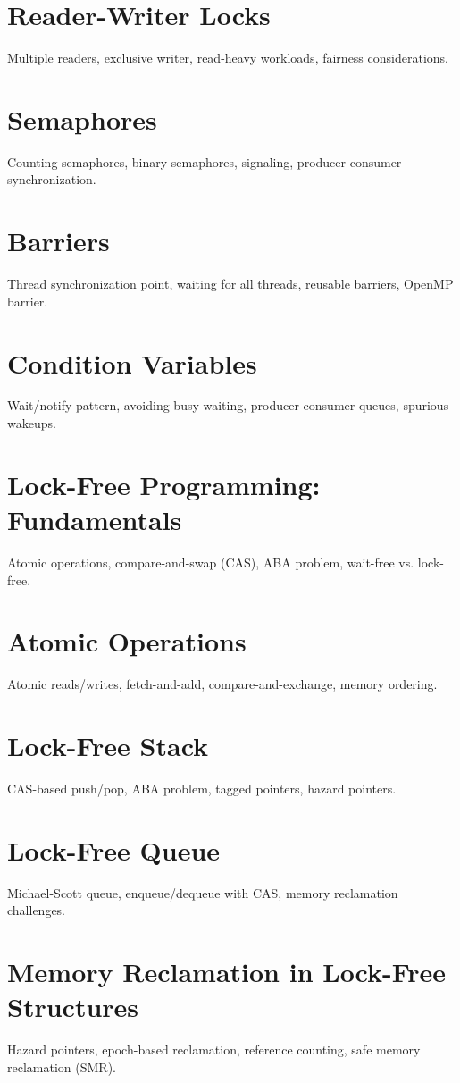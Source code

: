\chapter{Reader-Writer Locks}
Multiple readers, exclusive writer, read-heavy workloads, fairness considerations.

\chapter{Semaphores}
Counting semaphores, binary semaphores, signaling, producer-consumer synchronization.

\chapter{Barriers}
Thread synchronization point, waiting for all threads, reusable barriers, OpenMP barrier.

\chapter{Condition Variables}
Wait/notify pattern, avoiding busy waiting, producer-consumer queues, spurious wakeups.

\chapter{Lock-Free Programming: Fundamentals}
Atomic operations, compare-and-swap (CAS), ABA problem, wait-free vs. lock-free.

\chapter{Atomic Operations}
Atomic reads/writes, fetch-and-add, compare-and-exchange, memory ordering.

\chapter{Lock-Free Stack}
CAS-based push/pop, ABA problem, tagged pointers, hazard pointers.

\chapter{Lock-Free Queue}
Michael-Scott queue, enqueue/dequeue with CAS, memory reclamation challenges.

\chapter{Memory Reclamation in Lock-Free Structures}
Hazard pointers, epoch-based reclamation, reference counting, safe memory reclamation (SMR).

